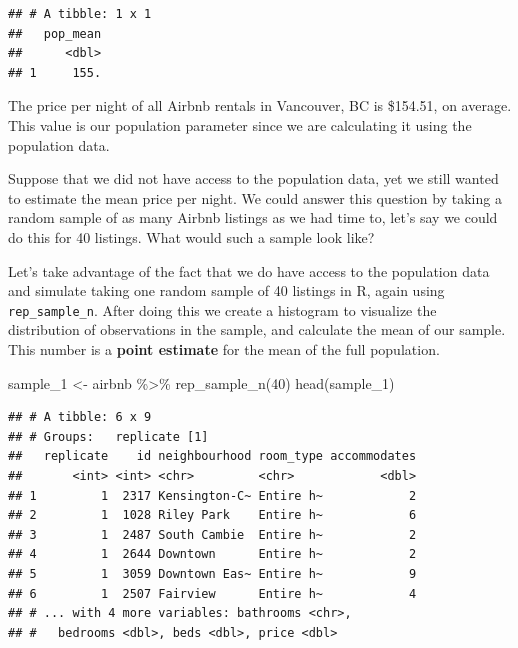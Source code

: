 \documentclass[
]{krantz}
\makeatletter
\newenvironment{Shaded}{\begin{snugshade}}{\end{snugshade}}
\newcommand{\AttributeTok}[1]{\textcolor[rgb]{0.61,0.61,0.61}{#1}}
\newcommand{\DecValTok}[1]{\textcolor[rgb]{0.06,0.06,0.06}{#1}}
\newcommand{\FunctionTok}[1]{\textcolor[rgb]{0,0,0}{#1}}
\newcommand{\NormalTok}[1]{#1}
\newcommand{\OtherTok}[1]{\textcolor[rgb]{0.37,0.37,0.37}{#1}}
\newcommand{\SpecialCharTok}[1]{\textcolor[rgb]{0,0,0}{#1}}
\newcommand{\StringTok}[1]{\textcolor[rgb]{0.5,0.5,0.5}{#1}}
\newenvironment{kframe}{%
\medskip{}
\setlength{\fboxsep}{.8em}
 \def\at@end@of@kframe{}%
 \ifinner\ifhmode%
  \def\at@end@of@kframe{\end{minipage}}%
  \begin{minipage}{\columnwidth}%
 \fi\fi%
 \def\FrameCommand##1{\hskip\@totalleftmargin \hskip-\fboxsep
 \colorbox{shadecolor}{##1}\hskip-\fboxsep
     \hskip-\linewidth \hskip-\@totalleftmargin \hskip\columnwidth}%
 \MakeFramed {\advance\hsize-\width
   \@totalleftmargin\z@ \linewidth\hsize
   \@setminipage}}%
 {\par\unskip\endMakeFramed%
 \at@end@of@kframe}
\renewenvironment{Shaded}{\begin{kframe}}{\end{kframe}}
\makeatother
\begin{document}
\begin{verbatim}
## # A tibble: 1 x 1
##   pop_mean
##      <dbl>
## 1     155.
\end{verbatim}

The price per night of all Airbnb rentals in Vancouver, BC is \$154.51, on average. This value is our population parameter since we are calculating it using the population data.

Suppose that we did not have access to the population data, yet we still wanted to estimate the mean price per night. We could answer this question by taking a random sample of as many Airbnb listings as we had time to, let's say we could do this for 40 listings. What would such a sample look like?

Let's take advantage of the fact that we do have access to the population data and simulate taking one random sample of 40 listings in R, again using \texttt{rep\_sample\_n}. After doing this we create a histogram to visualize the
distribution of observations in the sample,
and calculate the mean of our sample. This number is a \textbf{point estimate} for the mean of the full population.

\begin{Shaded}
\begin{Highlighting}[]
\NormalTok{sample\_1 }\OtherTok{\textless{}{-}}\NormalTok{ airbnb }\SpecialCharTok{\%\textgreater{}\%}
  \FunctionTok{rep\_sample\_n}\NormalTok{(}\DecValTok{40}\NormalTok{)}
\FunctionTok{head}\NormalTok{(sample\_1)}
\end{Highlighting}
\end{Shaded}

\begin{verbatim}
## # A tibble: 6 x 9
## # Groups:   replicate [1]
##   replicate    id neighbourhood room_type accommodates
##       <int> <int> <chr>         <chr>            <dbl>
## 1         1  2317 Kensington-C~ Entire h~            2
## 2         1  1028 Riley Park    Entire h~            6
## 3         1  2487 South Cambie  Entire h~            2
## 4         1  2644 Downtown      Entire h~            2
## 5         1  3059 Downtown Eas~ Entire h~            9
## 6         1  2507 Fairview      Entire h~            4
## # ... with 4 more variables: bathrooms <chr>,
## #   bedrooms <dbl>, beds <dbl>, price <dbl>
\end{verbatim}

\begin{Shaded}
\end{Shaded}
\end{document}
